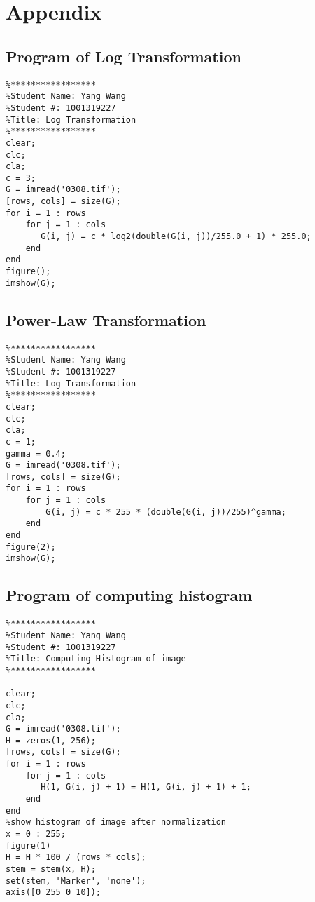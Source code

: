 \section{Appendix}
\subsection{Program of Log Transformation}
\begin{lstlisting}
%*****************
%Student Name: Yang Wang
%Student #: 1001319227
%Title: Log Transformation
%*****************
clear;
clc;
cla;
c = 3;
G = imread('0308.tif');
[rows, cols] = size(G);
for i = 1 : rows
    for j = 1 : cols
       G(i, j) = c * log2(double(G(i, j))/255.0 + 1) * 255.0;
    end
end 
figure();
imshow(G);    
\end{lstlisting}

\subsection{Power-Law Transformation}
\begin{lstlisting}
%*****************
%Student Name: Yang Wang
%Student #: 1001319227
%Title: Log Transformation
%*****************
clear;
clc;
cla;
c = 1;
gamma = 0.4;
G = imread('0308.tif');
[rows, cols] = size(G);
for i = 1 : rows 
    for j = 1 : cols
        G(i, j) = c * 255 * (double(G(i, j))/255)^gamma;
    end
end
figure(2);
imshow(G);   
\end{lstlisting}

\subsection{Program of computing histogram}
\begin{lstlisting}
%*****************
%Student Name: Yang Wang
%Student #: 1001319227
%Title: Computing Histogram of image
%*****************

clear;
clc;
cla;
G = imread('0308.tif');
H = zeros(1, 256);
[rows, cols] = size(G);
for i = 1 : rows
    for j = 1 : cols
       H(1, G(i, j) + 1) = H(1, G(i, j) + 1) + 1;
    end
end
%show histogram of image after normalization
x = 0 : 255;
figure(1)
H = H * 100 / (rows * cols);
stem = stem(x, H);
set(stem, 'Marker', 'none');
axis([0 255 0 10]);
\end{lstlisting}

